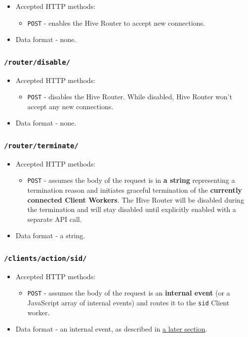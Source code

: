 \documentclass[a4paper]{article}
\begin{document}
\begin{itemize}
\item Accepted HTTP methods:
\begin{itemize}
\item \texttt{POST} - enables the Hive Router to accept new connections.
\end{itemize}
\item Data format - none.
\end{itemize}
\subsubsection{\texttt{/router/disable/}}
\label{sec-6-1-3}


\begin{itemize}
\item Accepted HTTP methods:
\begin{itemize}
\item \texttt{POST} - disables the Hive Router. While disabled, Hive Router won't accept any new connections.
\end{itemize}
\item Data format - none.
\end{itemize}
\subsubsection{\texttt{/router/terminate/}}
\label{sec-6-1-4}


\begin{itemize}
\item Accepted HTTP methods:
\begin{itemize}
\item \texttt{POST} - assumes the body of the request is in \textbf{a string} representing a termination reason and initiates graceful termination of the \textbf{currently connected Client Workers}. The Hive Router will be disabled during the termination and will stay disabled until explicitly enabled with a separate API call.
\end{itemize}
\item Data format - a string.
\end{itemize}
\subsubsection{\texttt{/clients/action/sid/}}
\label{sec-6-1-5}



\begin{itemize}
\item Accepted HTTP methods:
\begin{itemize}
\item \texttt{POST} - assumes the body of the request is an \textbf{internal event} (or a JavaScript array of internal events) and routes it to the \texttt{sid} Client worker.
\end{itemize}
\item Data format - an internal event, as described in \hyperref[sec-9-3]{a later section}.
\end{itemize}
\end{document}
